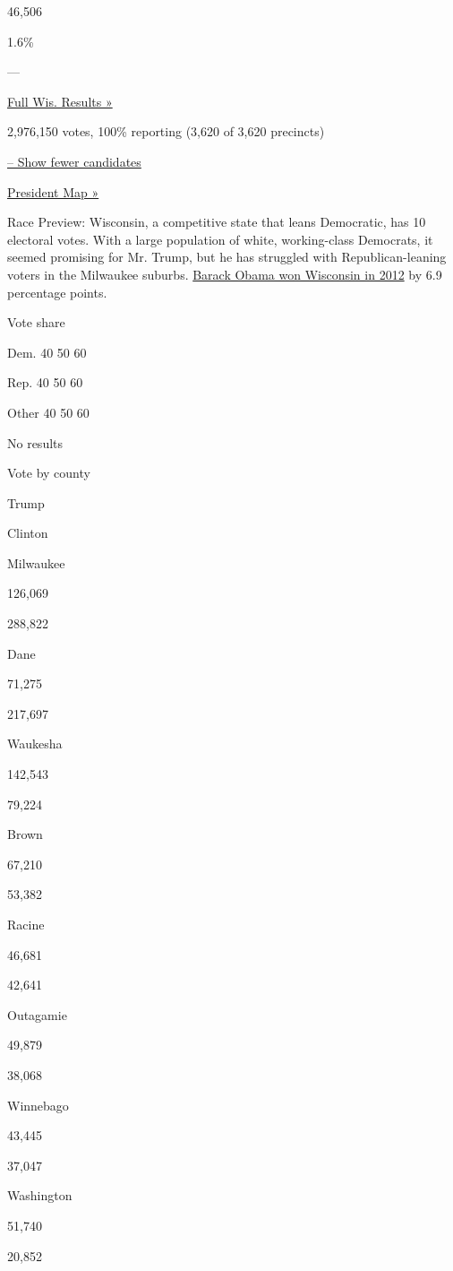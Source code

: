 46,506

1.6\%

---

\href{https://www.nytimes3xbfgragh.onion/elections/2016/results/wisconsin}{Full
Wis. Results »}

2,976,150 votes, 100\% reporting (3,620 of 3,620 precincts)

\protect\hyperlink{}{-- Show fewer candidates}

\href{//www.nytimes3xbfgragh.onion/elections/2016/results/president}{President
Map »}

Race Preview: Wisconsin, a competitive state that leans Democratic, has
10 electoral votes. With a large population of white, working-class
Democrats, it seemed promising for Mr. Trump, but he has struggled with
Republican-leaning voters in the Milwaukee suburbs.
\href{//elections.nytimes3xbfgragh.onion/2012/results/states/wisconsin}{Barack
Obama won Wisconsin in 2012} by 6.9 percentage points.

Vote share

Dem. 40 50 60

Rep. 40 50 60

Other 40 50 60

 No results

Vote by county

Trump

Clinton

Milwaukee

126,069

288,822

Dane

71,275

217,697

Waukesha

142,543

79,224

Brown

67,210

53,382

Racine

46,681

42,641

Outagamie

49,879

38,068

Winnebago

43,445

37,047

Washington

51,740

20,852

